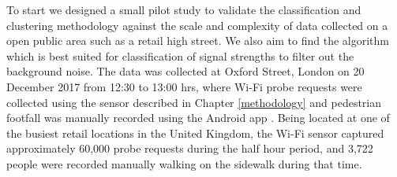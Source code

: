 To start we designed a small pilot study to validate the classification and clustering methodology against the scale and complexity of data collected on a open public area such as a retail high street.
We also aim to find the algorithm which is best suited for classification of signal strengths to filter out the background noise.
The data was collected at Oxford Street, London on 20 December 2017 from 12:30 to 13:00 hrs, where Wi-Fi probe requests were collected using the sensor described in Chapter \ref{methodology} and pedestrian footfall was manually recorded using the Android app \citep{bala2018clicker}.
Being located at one of the busiest retail locations in the United Kingdom, the Wi-Fi sensor captured approximately 60,000 probe requests during the half hour period, and 3,722 people were recorded manually walking on the sidewalk during that time.

